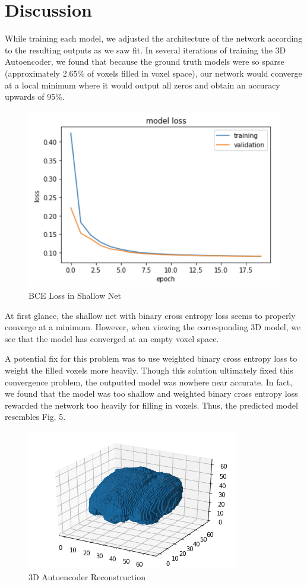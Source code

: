 \documentclass[conference, 10pt]{IEEEtran}
\begin{document}
\section{Discussion}
While training each model, we adjusted the architecture of the network according to the resulting outputs as we saw fit. In several iterations of training the 3D Autoencoder, we found that because the ground truth models were so sparse (approximately 2.65\% of voxels filled in voxel space), our network would converge at a local minimum where it would output all zeros and obtain an accuracy upwards of 95\%.


\begin{figure}[h]
    \centering
    \includegraphics[scale=0.3]{shallow_loss.png}
    \caption{BCE Loss in Shallow Net}
\end{figure}

At first glance, the shallow net with binary cross entropy loss seems to
properly converge at a minimum. However, when viewing the corresponding 3D
model, we see that the model has converged at an empty voxel space.

A potential fix for this problem was to use weighted binary cross entropy loss
to weight the filled voxels more heavily. Though this solution ultimately fixed
this convergence problem, the outputted model was nowhere near accurate. In
fact, we found that the model was too shallow and weighted binary cross entropy 
loss rewarded the network too heavily for filling in voxels. Thus, the
predicted model resembles Fig. 5.

\begin{figure}[h]
    \centering
    \includegraphics[scale=0.5]{figure_5.png}
    \caption{3D Autoencoder Reconstruction}
\end{figure}
\end{document}
